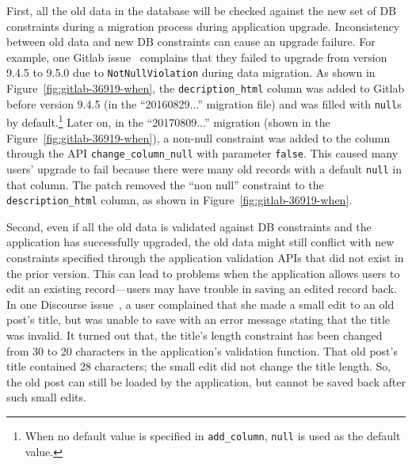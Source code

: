 First, all the old data in the database will be checked against the new set 
of DB constraints during a migration process during
application upgrade. 
Inconsistency between old data and new DB constraints can cause an upgrade failure.
For example,
one Gitlab issue~\cite{gitlab-36919} complains that they failed to upgrade from version 9.4.5 to 9.5.0 due to {\tt NotNullViolation} during data migration. As shown in Figure~\ref{fig:gitlab-36919-when}, the {\tt decription\_html} column was added 
to Gitlab before version 9.4.5 (in the ``20160829...'' migration file) and was filled with {\tt null}s by 
default.\footnote{When no default value is specified in {\tt add\_column}, {\tt null} is used as the default value.}
Later on, in the ``20170809...'' migration (shown in the Figure~\ref{fig:gitlab-36919-when}), a non-null constraint 
was added to the column through the API {\tt change\_column\_null} with parameter {\tt false}. This caused 
many users' upgrade to fail because there were many old records with
a default {\tt null} in that column. 
The patch removed the ``non null'' constraint to the {\tt description\_html} column, as shown in 
Figure~\ref{fig:gitlab-36919-when}. 


Second, even if all the old data is validated against DB constraints and the application has successfully upgraded, the old data might still conflict
with new constraints specified through the application validation APIs that did not exist in the prior version.
This can lead to problems when the application allows users to edit an existing
 record---users may have trouble in saving an edited record back.
In one Discourse issue~\cite{discourse-89148}, a user complained that she made a small edit to an old post's  title, but was unable to save with an error message stating that the title was invalid.
It turned out that, the 
title's length constraint has been changed from 30
 to 20 characters in the application's validation function. That old post's title contained
28 characters; the small edit did not change the title length. So, the old post can still be loaded by the application, but cannot be saved back after such small edits.
 

